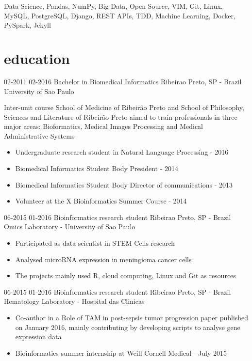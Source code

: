 \documentclass[]{friggeri-cv}
\begin{document}
\small Data Science, Pandas, NumPy, Big Data, Open Source, VIM, Git, Linux, MySQL, PostgreSQL, Django, REST APIs, TDD, Machine Learning, Docker, PySpark, Jekyll

\section{education}

\begin{entrylist}
  \entrysecondtype
    {02-2011 02-2016}
    {Bachelor in Biomedical Informatics}
    {Ribeirao Preto, SP - Brazil}
    {University of Sao Paulo}
    {Inter-unit course School of Medicine of Ribeirão Preto and School of Philosophy, Sciences and Literature of Ribeirão Preto aimed to train professionals in three major areas: Bioformatics, Medical Images Processing and Medical Administrative Systems
      \begin{itemize}
        \item Undergraduate research student in Natural Language Processing - 2016
        \item Biomedical Informatics Student Body President - 2014
        \item Biomedical Informatics Student Body Director of communications - 2013
        \item Volunteer at the X Bioinformatics Summer Course - 2014
      \end{itemize}
    }
\end{entrylist}

\begin{entrylist}
  \entrysecondtype
    {06-2015 01-2016}
    {Bioinformatics research student}
    {Ribeirao Preto, SP - Brazil}
    {Omics Laboratory - University of Sao Paulo}
    {\begin{itemize}
        \item Participated as data scientist in STEM Cells research
        \item Analysed microRNA expression in meningioma cancer cells
        \item The projects mainly used R, cloud computing, Linux and Git as resources
      \end{itemize}
    }
  \entrysecondtype
    {06-2015 01-2016}
    {Bioinformatics research student}
    {Ribeirao Preto, SP - Brazil}
    {Hematology Laboratory - Hospital das Clinicas}
    {
      \begin{itemize}
        \item Co-author in a Role of TAM in post-sepsis tumor progression paper published on January 2016, mainly contributing by developing scripts to analyse gene expression data
        \item Bioinformatics summer internship at Weill Cornell Medical - July 2015
      \end{itemize}
    }
\end{entrylist}
\end{document}

